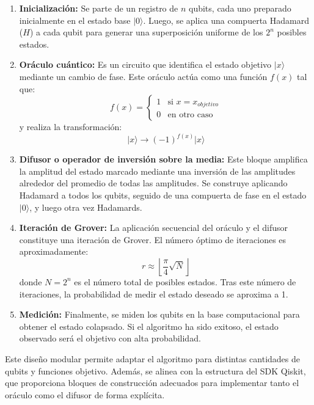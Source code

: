 \documentclass{article}
\begin{document}
\begin{enumerate}
    \item \textbf{Inicialización:} Se parte de un registro de $n$ qubits, cada uno preparado inicialmente en el estado base $\vert 0 \rangle$. Luego, se aplica una compuerta Hadamard ($H$) a cada qubit para generar una superposición uniforme de los $2^n$ posibles estados.

    \item \textbf{Oráculo cuántico:} Es un circuito que identifica el estado objetivo $\vert x \rangle$ mediante un cambio de fase. Este oráculo actúa como una función $f(x)$ tal que:
    \[
    f(x) = \begin{cases}
    1 & \text{si } x = x_{objetivo} \\
    0 & \text{en otro caso}
    \end{cases}
    \]
    y realiza la transformación:
    \[
    \vert x \rangle \rightarrow (-1)^{f(x)} \vert x \rangle
    \]

    \item \textbf{Difusor o operador de inversión sobre la media:} Este bloque amplifica la amplitud del estado marcado mediante una inversión de las amplitudes alrededor del promedio de todas las amplitudes. Se construye aplicando Hadamard a todos los qubits, seguido de una compuerta de fase en el estado $\vert 0 \rangle$, y luego otra vez Hadamards.

    \item \textbf{Iteración de Grover:} La aplicación secuencial del oráculo y el difusor constituye una iteración de Grover. El número óptimo de iteraciones es aproximadamente:
    \[
    r \approx \left\lfloor \frac{\pi}{4} \sqrt{N} \right\rfloor
    \]
    donde $N = 2^n$ es el número total de posibles estados. Tras este número de iteraciones, la probabilidad de medir el estado deseado se aproxima a 1.

    \item \textbf{Medición:} Finalmente, se miden los qubits en la base computacional para obtener el estado colapsado. Si el algoritmo ha sido exitoso, el estado observado será el objetivo con alta probabilidad.
    
\end{enumerate}

Este diseño modular permite adaptar el algoritmo para distintas cantidades de qubits y funciones objetivo. Además, se alinea con la estructura del SDK Qiskit, que proporciona bloques de construcción adecuados para implementar tanto el oráculo como el difusor de forma explícita.
\end{document}

